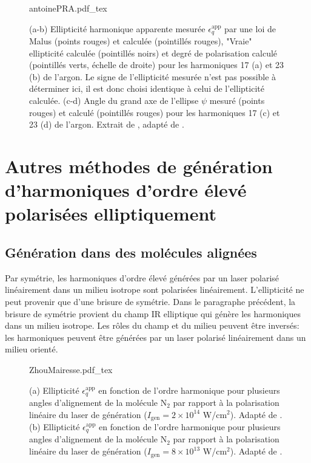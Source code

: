 \begin{figure}
\centering
\def\svgwidth{\textwidth}
{antoinePRA.pdf_tex}
\caption{(a-b) Ellipticité harmonique apparente mesurée $\epsilon_q^{\text{app}}$ par une loi de Malus (points rouges) et calculée (pointillés rouges), "Vraie" ellipticité calculée (pointillés noirs) et degré de polarisation calculé (pointillés verts, échelle de droite) pour les harmoniques 17 (a) et 23 (b) de l'argon. Le signe de l'ellipticité mesurée n'est pas possible à déterminer ici, il est donc choisi identique à celui de l'ellipticité calculée. (c-d) Angle du grand axe de l'ellipse $\psi$ mesuré (points rouges) et calculé (pointillés rouges) pour les harmoniques 17 (c) et 23 (d) de l'argon. Extrait de , adapté de .}
\label{fig:Antoine}
\end{figure}

\section{Autres méthodes de génération d'harmoniques d'ordre élevé polarisées elliptiquement}
\subsection{Génération dans des molécules alignées}
Par symétrie, les harmoniques d'ordre élevé générées par un laser polarisé linéairement dans un milieu isotrope sont polarisées linéairement. L'ellipticité ne peut provenir que d'une brisure de symétrie. Dans le paragraphe précédent, la brisure de symétrie provient du champ IR elliptique qui génère les harmoniques dans un milieu isotrope. Les rôles du champ et du milieu peuvent être inversés: les harmoniques peuvent être générées par un laser polarisé linéairement dans un milieu orienté.

\begin{figure}[ht]
\centering
\def\svgwidth{\textwidth}
{ZhouMairesse.pdf_tex}
\caption{(a) Ellipticité $\epsilon_q^{\text{app}}$ en fonction de l'ordre harmonique pour plusieurs angles d'alignement de la molécule N$_2$ par rapport à la polarisation linéaire du laser de génération ($I_{\text{gen}} = 2 \times 10^{14}$ W/cm$^2$). Adapté de . (b) Ellipticité $\epsilon_q^{\text{app}}$ en fonction de l'ordre harmonique pour plusieurs angles d'alignement de la molécule N$_2$ par rapport à la polarisation linéaire du laser de génération ($I_{\text{gen}} = 8 \times 10^{13}$ W/cm$^2$). Adapté de .}
\label{fig:ZhouMairesse}
\end{figure}

